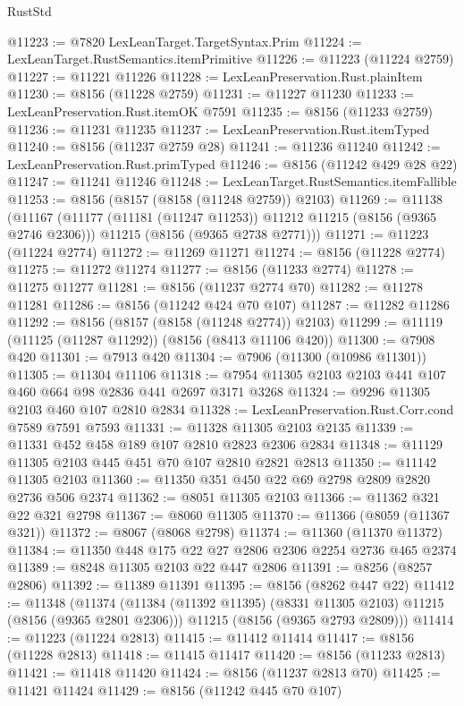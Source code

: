 \begin{lexlean}{RustStd}
\begin{coremodule}
{\begin{coremodule}
{{{{{{{{{{{{{{{{{{{{{{{{{{{{{{{{{{@11223 := @7820 LexLeanTarget.TargetSyntax.Prim
@11224 := LexLeanTarget.RustSemantics.itemPrimitive
@11226 := @11223 (@11224 @2759)
@11227 := @11221 @11226
@11228 := LexLeanPreservation.Rust.plainItem
@11230 := @8156 (@11228 @2759)
@11231 := @11227 @11230
@11233 := LexLeanPreservation.Rust.itemOK @7591
@11235 := @8156 (@11233 @2759)
@11236 := @11231 @11235
@11237 := LexLeanPreservation.Rust.itemTyped
@11240 := @8156 (@11237 @2759 @28)
@11241 := @11236 @11240
@11242 := LexLeanPreservation.Rust.primTyped
@11246 := @8156 (@11242 @429 @28 @22)
@11247 := @11241 @11246
@11248 := LexLeanTarget.RustSemantics.itemFallible
@11253 := @8156 (@8157 (@8158 (@11248 @2759)) @2103)
@11269 := @11138
    (@11167
      (@11177 (@11181 (@11247 @11253)) @11212 @11215 (@8156 (@9365 @2746 @2306)))
      @11215
      (@8156 (@9365 @2738 @2771)))
@11271 := @11223 (@11224 @2774)
@11272 := @11269 @11271
@11274 := @8156 (@11228 @2774)
@11275 := @11272 @11274
@11277 := @8156 (@11233 @2774)
@11278 := @11275 @11277
@11281 := @8156 (@11237 @2774 @70)
@11282 := @11278 @11281
@11286 := @8156 (@11242 @424 @70 @107)
@11287 := @11282 @11286
@11292 := @8156 (@8157 (@8158 (@11248 @2774)) @2103)
@11299 := @11119 (@11125 (@11287 @11292)) (@8156 (@8413 @11106 @420))
@11300 := @7908 @420
@11301 := @7913 @420
@11304 := @7906 (@11300 (@10986 @11301))
@11305 := @11304 @11106
@11318 := @7954 @11305 @2103 @2103 @441 @107 @460 @664 @98 @2836 @441 @2697 @3171 @3268
@11324 := @9296 @11305 @2103 @460 @107 @2810 @2834
@11328 := LexLeanPreservation.Rust.Corr.cond @7589 @7591 @7593
@11331 := @11328 @11305 @2103 @2135
@11339 := @11331 @452 @458 @189 @107 @2810 @2823 @2306 @2834
@11348 := @11129 @11305 @2103 @445 @451 @70 @107 @2810 @2821 @2813
@11350 := @11142 @11305 @2103
@11360 := @11350 @351 @450 @22 @69 @2798 @2809 @2820 @2736 @506 @2374
@11362 := @8051 @11305 @2103
@11366 := @11362 @321 @22 @321 @2798
@11367 := @8060 @11305
@11370 := @11366 (@8059 (@11367 @321))
@11372 := @8067 (@8068 @2798)
@11374 := @11360 (@11370 @11372)
@11384 := @11350 @448 @175 @22 @27 @2806 @2306 @2254 @2736 @465 @2374
@11389 := @8248 @11305 @2103 @22 @447 @2806
@11391 := @8256 (@8257 @2806)
@11392 := @11389 @11391
@11395 := @8156 (@8262 @447 @22)
@11412 := @11348
    (@11374
      (@11384 (@11392 @11395) (@8331 @11305 @2103) @11215 (@8156 (@9365 @2801 @2306)))
      @11215
      (@8156 (@9365 @2793 @2809)))
@11414 := @11223 (@11224 @2813)
@11415 := @11412 @11414
@11417 := @8156 (@11228 @2813)
@11418 := @11415 @11417
@11420 := @8156 (@11233 @2813)
@11421 := @11418 @11420
@11424 := @8156 (@11237 @2813 @70)
@11425 := @11421 @11424
@11429 := @8156 (@11242 @445 @70 @107)
}}}}}}}}}}}}}}}}}}}}}}}}}}}}}}}}}}
\end{coremodule}}
\end{coremodule}
\end{lexlean}
